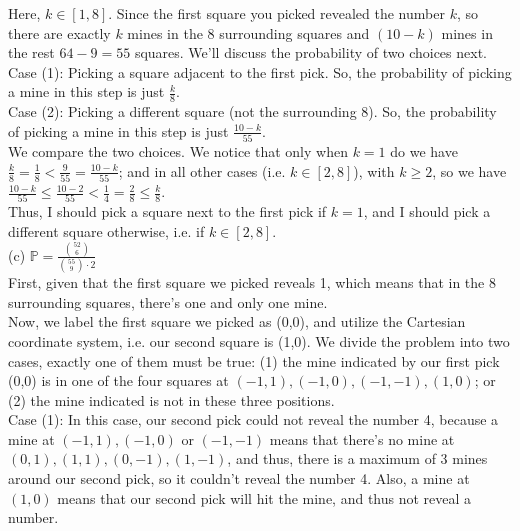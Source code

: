 \documentclass{article}
\begin{document}
Here, $k\in[1, 8]$. Since the first square you picked revealed the number $k$, so there are exactly $k$ mines in the 8 surrounding squares and $(10-k)$ mines in the rest $64-9=55$ squares. We'll discuss the probability of two choices next. \\

Case (1): Picking a square adjacent to the first pick. So, the probability of picking a mine in this step is just $\frac{k}{8}$. \\

Case (2): Picking a different square (not the surrounding 8). So, the probability of picking a mine in this step is just $\frac{10-k}{55}$. \\

We compare the two choices. We notice that only when $k=1$ do we have $\frac{k}{8} = \frac{1}{8} < \frac{9}{55} = \frac{10-k}{55}$; and in all other cases (i.e. $k\in[2, 8]$), with $k\geq2$, so we have $\frac{10-k}{55} \leq \frac{10-2}{55} < \frac{1}{4} = \frac{2}{8} \leq \frac{k}{8}$. \\

Thus, I should pick a square next to the first pick if $k=1$, and I should pick a different square otherwise, i.e. if $k\in[2,8]$. \\[.5cm]
{\color{red} (c) $\mathbb{P} = \frac{\binom{52}{6}}{\binom{55}{9}\cdot2}$} \\

First, given that the first square we picked reveals 1, which means that in the 8 surrounding squares, there's one and only one mine. \\

Now, we label the first square we picked as (0,0), and utilize the Cartesian coordinate system, i.e. our second square is (1,0). We divide the problem into two cases, exactly one of them must be true: (1) the mine indicated by our first pick (0,0) is in one of the four squares at $(-1,1), (-1,0), (-1,-1), (1,0)$; or (2) the mine indicated is not in these three positions. \\

Case (1): In this case, our second pick could not reveal the number 4, because a mine at $(-1,1), (-1,0)$ or $(-1,-1)$ means that there's no mine at $(0,1), (1,1), (0,-1), (1,-1)$, and thus, there is a maximum of 3 mines around our second pick, so it couldn't reveal the number 4. Also, a mine at $(1,0)$ means that our second pick will hit the mine, and thus not reveal a number. \\
\end{document}
